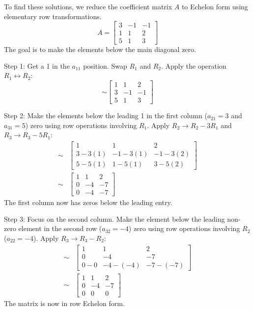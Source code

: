\documentclass{article}
\begin{document}
To find these solutions, we reduce the coefficient matrix $A$ to Echelon form using elementary row transformations.
\[ A = \begin{bmatrix} 3 & -1 & -1 \\ 1 & 1 & 2 \\ 5 & 1 & 3 \end{bmatrix} \]
The goal is to make the elements below the main diagonal zero.

Step 1: Get a 1 in the $a_{11}$ position. Swap $R_1$ and $R_2$.
Apply the operation $R_1 \leftrightarrow R_2$:
\[ \sim \begin{bmatrix} 1 & 1 & 2 \\ 3 & -1 & -1 \\ 5 & 1 & 3 \end{bmatrix} \]

Step 2: Make the elements below the leading 1 in the first column ($a_{21}=3$ and $a_{31}=5$) zero using row operations involving $R_1$.
Apply $R_2 \to R_2 - 3R_1$ and $R_3 \to R_3 - 5R_1$:
\begin{align*} \sim &\begin{bmatrix} 1 & 1 & 2 \\ 3 - 3(1) & -1 - 3(1) & -1 - 3(2) \\ 5 - 5(1) & 1 - 5(1) & 3 - 5(2) \end{bmatrix} \\ \sim &\begin{bmatrix} 1 & 1 & 2 \\ 0 & -4 & -7 \\ 0 & -4 & -7 \end{bmatrix}\end{align*}
The first column now has zeros below the leading entry.

Step 3: Focus on the second column. Make the element below the leading non-zero element in the second row ($a_{32}=-4$) zero using row operations involving $R_2$ ($a_{22}=-4$).
Apply $R_3 \to R_3 - R_2$:
\begin{align*} \sim &\begin{bmatrix} 1 & 1 & 2 \\ 0 & -4 & -7 \\ 0 - 0 & -4 - (-4) & -7 - (-7) \end{bmatrix} \\ \sim &\begin{bmatrix} 1 & 1 & 2 \\ 0 & -4 & -7 \\ 0 & 0 & 0 \end{bmatrix}\end{align*}
The matrix is now in row Echelon form.
\end{document}
